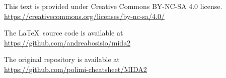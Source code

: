 This text is provided under Creative Commons BY-NC-SA 4.0 license.\\
\url{https://creativecommons.org/licenses/by-nc-sa/4.0/}

The \LaTeX \ source code is available at\\
\url{https://github.com/andreabosisio/mida2}

The original repository is available at\\
\url{https://github.com/polimi-cheatsheet/MIDA2}